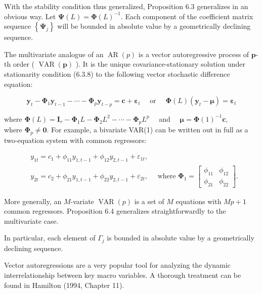 \documentclass[10pt]{article}
\begin{document}
With the stability condition thus generalized, Proposition 6.3 generalizes in an obvious way. Let $\boldsymbol{\Psi}(L)=\boldsymbol{\Phi}(L)^{-1}$. Each component of the coefficient matrix sequence $\left\{\boldsymbol{\Psi}_{j}\right\}$ will be bounded in absolute value by a geometrically declining sequence.

The multivariate analogue of an $\operatorname{AR}(p)$ is a vector autoregressive process of $\boldsymbol{p}$-th order ( $\operatorname{VAR}(\boldsymbol{p})$ ). It is the unique covariance-stationary solution under stationarity condition (6.3.8) to the following vector stochastic difference equation:

$$
\mathbf{y}_{t}-\boldsymbol{\Phi}_{1} \mathbf{y}_{t-1}-\cdots-\boldsymbol{\Phi}_{p} \mathbf{y}_{t-p}=\mathbf{c}+\boldsymbol{\varepsilon}_{t} \quad \text { or } \quad \boldsymbol{\Phi}(L)\left(\mathbf{y}_{t}-\boldsymbol{\mu}\right)=\boldsymbol{\varepsilon}_{t}
$$

where $\boldsymbol{\Phi}(L)=\mathbf{I}_{r}-\boldsymbol{\Phi}_{1} L-\boldsymbol{\Phi}_{2} L^{2}-\cdots-\boldsymbol{\Phi}_{p} L^{p} \quad$ and $\quad \boldsymbol{\mu}=\boldsymbol{\Phi}(1)^{-1} \mathbf{c}$,\\
where $\boldsymbol{\Phi}_{p} \neq \mathbf{0}$. For example, a bivariate VAR(1) can be written out in full as a two-equation system with common regressors:

$$
\begin{aligned}
& y_{1 t}=c_{1}+\phi_{11} y_{1, t-1}+\phi_{12} y_{2, t-1}+\varepsilon_{1 t}, \\
& y_{2 t}=c_{2}+\phi_{21} y_{1, t-1}+\phi_{22} y_{2, t-1}+\varepsilon_{2 t}, \quad \text { where } \boldsymbol{\Phi}_{1}=\left[\begin{array}{ll}
\phi_{11} & \phi_{12} \\
\phi_{21} & \phi_{22}
\end{array}\right] .
\end{aligned}
$$

More generally, an $M$-variate $\operatorname{VAR}(p)$ is a set of $M$ equations with $M p+1$ common regressors. Proposition 6.4 generalizes straightforwardly to the multivariate case.

In particular, each element of $\Gamma_{j}$ is bounded in absolute value by a geometrically declining sequence.

Vector autoregressions are a very popular tool for analyzing the dynamic interrelationship between key macro variables. A thorough treatment can be found in Hamilton (1994, Chapter 11).
\end{document}
